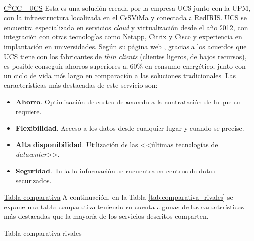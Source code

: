 \noindent\underline{C\textsuperscript{3}CC - \acs{UCS}}\newline
\indent Esta es una solución creada por la empresa \acf{UCS} junto con la \acf{UPM}, con la infraestructura localizada en el \acf{CeSViMa} y conectada a RedIRIS. \acs{UCS} se encuentra especializada en servicios \textit{cloud} y virtualización desde el año 2012, con integración con otras tecnologías como Netapp, Citrix y Cisco y experiencia en implantación en universidades. Según su página web \cite{c3ce}, gracias a los acuerdos que \acs{UCS} tiene con los fabricantes de \textit{thin clients} (clientes ligeros, de bajos recursos), es posible conseguir ahorros superiores al 60\% en consumo energético, junto con un ciclo de vida más largo en comparación a las soluciones tradicionales. Las características más destacadas de este servicio son:

\begin{itemize}
    \item \textbf{Ahorro}. Optimización de costes de acuerdo a la contratación de lo que se requiere.
    
    \item \textbf{Flexibilidad}. Acceso a los datos desde cualquier lugar y cuando se precise.
    
    \item \textbf{Alta disponibilidad}. Utilización de las <<últimas tecnologías de \textit{datacenter}>>.
    
    \item \textbf{Seguridad}. Toda la información se encuentra en centros de datos securizados.
\end{itemize}

\noindent\underline{Tabla comparativa}\newline
\indent A continuación, en la Tabla \ref{tab:comparativa_rivales} se expone una tabla comparativa teniendo en cuenta algunas de las características más destacadas que la mayoría de los servicios descritos comparten.

\begin{table}[hp]
	\centering
	{\small
		
	}
	\caption[Tabla comparativa rivales]
	{Tabla comparativa rivales}
	\label{tab:comparativa_rivales}
\end{table}

\clearpage

